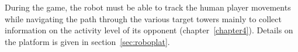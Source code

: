 
During the game, the robot must be able to track the human player movements while navigating the path through the various target towers mainly to collect information on the activity level of its opponent (chapter~\ref{chapter4}). Details on the platform is given in section~\ref{sec:roboplat}.


